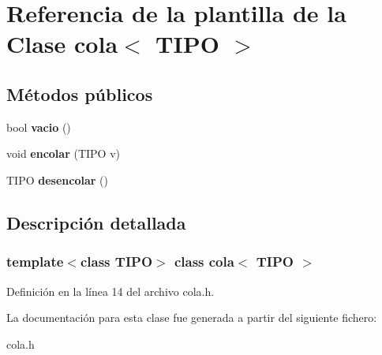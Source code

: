 \hypertarget{classcola}{}\section{Referencia de la plantilla de la Clase cola$<$ T\+I\+PO $>$}
\label{classcola}
\subsection*{Métodos públicos}
\begin{DoxyCompactItemize}
\item 
\mbox{\label{classcola_a2af9a71dd856a907f446a1e396d83e5b}} 
bool {\bfseries vacio} ()
\item 
\mbox{\label{classcola_a4fe29cbff3478979d38a0f8a2d7a4b51}} 
void {\bfseries encolar} (T\+I\+PO v)
\item 
\mbox{\label{classcola_afbe13fa4237aa2fde61067900ff8f884}} 
T\+I\+PO {\bfseries desencolar} ()
\end{DoxyCompactItemize}


\subsection{Descripción detallada}
\subsubsection*{template$<$class T\+I\+PO$>$\newline
class cola$<$ T\+I\+P\+O $>$}



Definición en la línea 14 del archivo cola.\+h.



La documentación para esta clase fue generada a partir del siguiente fichero\+:\begin{DoxyCompactItemize}
\item 
cola.\+h\end{DoxyCompactItemize}

